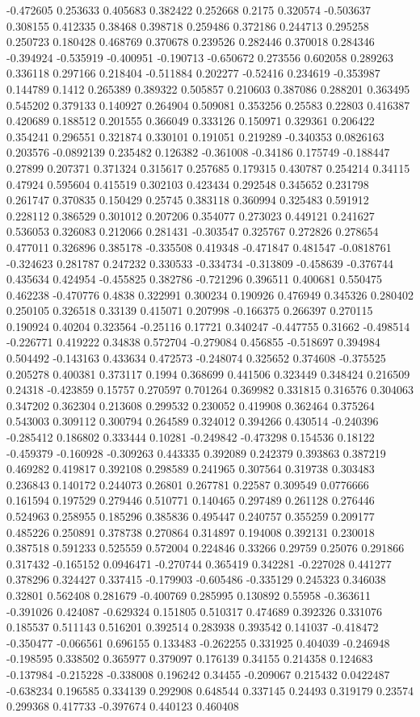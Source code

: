 -0.472605 0.253633 0.405683 0.382422 0.252668 0.2175 0.320574 -0.503637 0.308155 0.412335 0.38468 0.398718 0.259486 0.372186 0.244713 0.295258 0.250723 0.180428 0.468769 0.370678 0.239526 0.282446 0.370018 0.284346 -0.394924 -0.535919 -0.400951 -0.190713 -0.650672 0.273556 0.602058 0.289263 0.336118 0.297166 0.218404 -0.511884 0.202277 -0.52416 0.234619 -0.353987 0.144789 0.1412 0.265389 0.389322 0.505857 0.210603 0.387086 0.288201 0.363495 0.545202 0.379133 0.140927 0.264904 0.509081 0.353256 0.25583 0.22803 0.416387 0.420689 0.188512 0.201555 0.366049 0.333126 0.150971 0.329361 0.206422 0.354241 0.296551 0.321874 0.330101 0.191051 0.219289 -0.340353 0.0826163 0.203576 -0.0892139 0.235482 0.126382 -0.361008 -0.34186 0.175749 -0.188447 0.27899 0.207371 0.371324 0.315617 0.257685 0.179315 0.430787 0.254214 0.34115 0.47924 0.595604 0.415519 0.302103 0.423434 0.292548 0.345652 0.231798 0.261747 0.370835 0.150429 0.25745 0.383118 0.360994 0.325483 0.591912 0.228112 0.386529 0.301012 0.207206 0.354077 0.273023 0.449121 0.241627 0.536053 0.326083 0.212066 0.281431 -0.303547 0.325767 0.272826 0.278654 0.477011 0.326896 0.385178 -0.335508 0.419348 -0.471847 0.481547 -0.0818761 -0.324623 0.281787 0.247232 0.330533 -0.334734 -0.313809 -0.458639 -0.376744 0.435634 0.424954 -0.455825 0.382786 -0.721296 0.396511 0.400681 0.550475 0.462238 -0.470776 0.4838 0.322991 0.300234 0.190926 0.476949 0.345326 0.280402 0.250105 0.326518 0.33139 0.415071 0.207998 -0.166375 0.266397 0.270115 0.190924 0.40204 0.323564 -0.25116 0.17721 0.340247 -0.447755 0.31662 -0.498514 -0.226771 0.419222 0.34838 0.572704 -0.279084 0.456855 -0.518697 0.394984 0.504492 -0.143163 0.433634 0.472573 -0.248074 0.325652 0.374608 -0.375525 0.205278 0.400381 0.373117 0.1994 0.368699 0.441506 0.323449 0.348424 0.216509 0.24318 -0.423859 0.15757 0.270597 0.701264 0.369982 0.331815 0.316576 0.304063 0.347202 0.362304 0.213608 0.299532 0.230052 0.419908 0.362464 0.375264 0.543003 0.309112 0.300794 0.264589 0.324012 0.394266 0.430514 -0.240396 -0.285412 0.186802 0.333444 0.10281 -0.249842 -0.473298 0.154536 0.18122 -0.459379 -0.160928 -0.309263 0.443335 0.392089 0.242379 0.393863 0.387219 0.469282 0.419817 0.392108 0.298589 0.241965 0.307564 0.319738 0.303483 0.236843 0.140172 0.244073 0.26801 0.267781 0.22587 0.309549 0.0776666 0.161594 0.197529 0.279446 0.510771 0.140465 0.297489 0.261128 0.276446 0.524963 0.258955 0.185296 0.385836 0.495447 0.240757 0.355259 0.209177 0.485226 0.250891 0.378738 0.270864 0.314897 0.194008 0.392131 0.230018 0.387518 0.591233 0.525559 0.572004 0.224846 0.33266 0.29759 0.25076 0.291866 0.317432 -0.165152 0.0946471 -0.270744 0.365419 0.342281 -0.227028 0.441277 0.378296 0.324427 0.337415 -0.179903 -0.605486 -0.335129 0.245323 0.346038 0.32801 0.562408 0.281679 -0.400769 0.285995 0.130892 0.55958 -0.363611 -0.391026 0.424087 -0.629324 0.151805 0.510317 0.474689 0.392326 0.331076 0.185537 0.511143 0.516201 0.392514 0.283938 0.393542 0.141037 -0.418472 -0.350477 -0.066561 0.696155 0.133483 -0.262255 0.331925 0.404039 -0.246948 -0.198595 0.338502 0.365977 0.379097 0.176139 0.34155 0.214358 0.124683 -0.137984 -0.215228 -0.338008 0.196242 0.34455 -0.209067 0.215432 0.0422487 -0.638234 0.196585 0.334139 0.292908 0.648544 0.337145 0.24493 0.319179 0.23574 0.299368 0.417733 -0.397674 0.440123 0.460408 